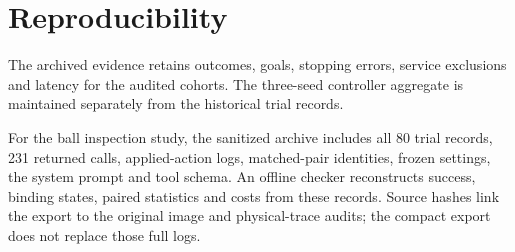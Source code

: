 \section{Reproducibility}
The archived evidence retains outcomes, goals, stopping errors, service exclusions and latency for the audited cohorts. The three-seed controller aggregate is maintained separately from the historical trial records.

For the ball inspection study, the sanitized archive includes all 80 trial records, 231 returned calls, applied-action logs, matched-pair identities, frozen settings, the system prompt and tool schema. An offline checker reconstructs success, binding states, paired statistics and costs from these records. Source hashes link the export to the original image and physical-trace audits; the compact export does not replace those full logs.

